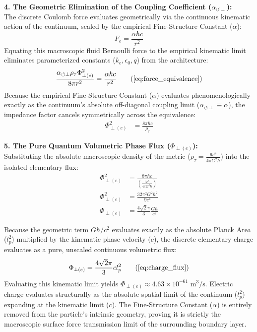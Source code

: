 \documentclass[11pt, a4paper]{article}
\begin{document}
\textbf{4. The Geometric Elimination of the Coupling Coefficient ($\alpha_{\circlearrowleft \perp}$):} \\
The discrete Coulomb force evaluates geometrically via the continuous kinematic action of the continuum, scaled by the empirical Fine-Structure Constant ($\alpha$):
\begin{equation}
    F_e = \frac{\alpha \hbar c}{r^2}
\end{equation}
Equating this macroscopic fluid Bernoulli force to the empirical kinematic limit eliminates parameterized constants ($k_e, \epsilon_0, q$) from the architecture:
\begin{equation}
    \frac{\alpha_{\circlearrowleft \perp} \rho_{\tau} \Phi_{\perp(e)}^2}{8\pi r^2} = \frac{\alpha \hbar c}{r^2} \tag{\ref{eq:force_equivalence}}
\end{equation}
Because the empirical Fine-Structure Constant ($\alpha$) evaluates phenomenologically exactly as the continuum's absolute off-diagonal coupling limit ($\alpha_{\circlearrowleft \perp} \equiv \alpha$), the impedance factor cancels symmetrically across the equivalence:
\begin{align}
    \Phi_{\perp(e)}^2 &= \frac{8\pi \hbar c}{\rho_{\tau}}
\end{align}

\textbf{5. The Pure Quantum Volumetric Phase Flux ($\Phi_{\perp(e)}$):} \\
Substituting the absolute macroscopic density of the metric ($\rho_{\tau} = \frac{9 c^5}{4\pi G^2 \hbar}$) into the isolated elementary flux:
\begin{align}
    \Phi_{\perp(e)}^2 &= \frac{8\pi \hbar c}{\left(\frac{9 c^5}{4\pi G^2 \hbar}\right)}  \\
    \Phi_{\perp(e)}^2 &= \frac{32\pi^2 G^2 \hbar^2}{9 c^4}  \\
    \Phi_{\perp(e)} &= \frac{4\sqrt{2}\pi}{3} \frac{G \hbar}{c^2} 
\end{align}

Because the geometric term $G\hbar/c^2$ evaluates exactly as the absolute Planck Area ($l_p^2$) multiplied by the kinematic phase velocity ($c$), the discrete elementary charge evaluates as a pure, unscaled continuous volumetric flux:
\begin{equation}
    \Phi_{\perp(e)} = \frac{4\sqrt{2}\pi}{3} c \space l_p^2 \tag{\ref{eq:charge_flux}}
\end{equation}
Evaluating this kinematic limit yields $\Phi_{\perp(e)} \approx 4.63 \times 10^{-61} \text{ m}^3/\text{s}$. Electric charge evaluates structurally as the absolute spatial limit of the continuum ($l_p^2$) expanding at the kinematic limit ($c$). The Fine-Structure Constant ($\alpha$) is entirely removed from the particle's intrinsic geometry, proving it is strictly the macroscopic surface force transmission limit of the surrounding boundary layer.
\end{document}
